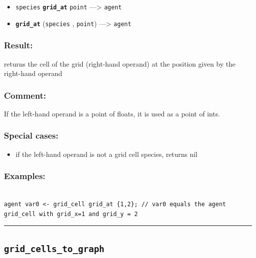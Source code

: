 \documentclass[]{book}
\providecommand{\tightlist}{%
  \setlength{\itemsep}{0pt}\setlength{\parskip}{0pt}}
\theoremstyle{definition}
\theoremstyle{definition}
\theoremstyle{definition}
\theoremstyle{remark}
\begin{document}
\begin{itemize}
\tightlist
\item
  \texttt{species} \textbf{\texttt{grid\_at}} \texttt{point}
  ---\textgreater{} \texttt{agent}
\item
  \textbf{\texttt{grid\_at}} (\texttt{species} , \texttt{point})
  ---\textgreater{} \texttt{agent}
\end{itemize}

\subsubsection{Result:}\label{result-232}

returns the cell of the grid (right-hand operand) at the position given
by the right-hand operand

\subsubsection{Comment:}\label{comment-45}

If the left-hand operand is a point of floats, it is used as a point of
ints.

\subsubsection{Special cases:}\label{special-cases-73}

\begin{itemize}
\tightlist
\item
  if the left-hand operand is not a grid cell species, returns nil
\end{itemize}

\subsubsection{Examples:}\label{examples-182}

\begin{verbatim}
 
agent var0 <- grid_cell grid_at {1,2}; // var0 equals the agent grid_cell with grid_x=1 and grid_y = 2
\end{verbatim}

\begin{center}\rule{0.5\linewidth}{\linethickness}\end{center}

\subsection{\texorpdfstring{\texttt{grid\_cells\_to\_graph}}{grid\_cells\_to\_graph}}\label{grid_cells_to_graph}
\end{document}
